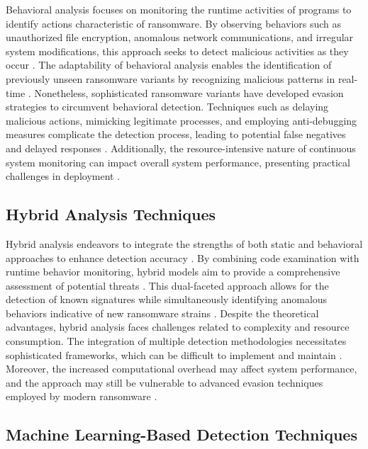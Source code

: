 \documentclass[lettersize,journal]{IEEEtran}
\begin{document}
Behavioral analysis focuses on monitoring the runtime activities of programs to identify actions characteristic of ransomware. By observing behaviors such as unauthorized file encryption, anomalous network communications, and irregular system modifications, this approach seeks to detect malicious activities as they occur \cite{anikolova2024ransomware}. The adaptability of behavioral analysis enables the identification of previously unseen ransomware variants by recognizing malicious patterns in real-time \cite{miha2024novel}. Nonetheless, sophisticated ransomware variants have developed evasion strategies to circumvent behavioral detection. Techniques such as delaying malicious actions, mimicking legitimate processes, and employing anti-debugging measures complicate the detection process, leading to potential false negatives and delayed responses \cite{findlay2024dynamic}. Additionally, the resource-intensive nature of continuous system monitoring can impact overall system performance, presenting practical challenges in deployment \cite{altais2024novel}.

\subsection{Hybrid Analysis Techniques}

Hybrid analysis endeavors to integrate the strengths of both static and behavioral approaches to enhance detection accuracy \cite{leisner2024ransomware,chadler2024ransomware}. By combining code examination with runtime behavior monitoring, hybrid models aim to provide a comprehensive assessment of potential threats \cite{mcgarret2024neural}. This dual-faceted approach allows for the detection of known signatures while simultaneously identifying anomalous behaviors indicative of new ransomware strains \cite{wasoye2024ransomware}. Despite the theoretical advantages, hybrid analysis faces challenges related to complexity and resource consumption. The integration of multiple detection methodologies necessitates sophisticated frameworks, which can be difficult to implement and maintain \cite{meledina2024innovative, roger2024predictive}. Moreover, the increased computational overhead may affect system performance, and the approach may still be vulnerable to advanced evasion techniques employed by modern ransomware \cite{knaapen2024novel}.

\subsection{Machine Learning-Based Detection Techniques}
\end{document}
